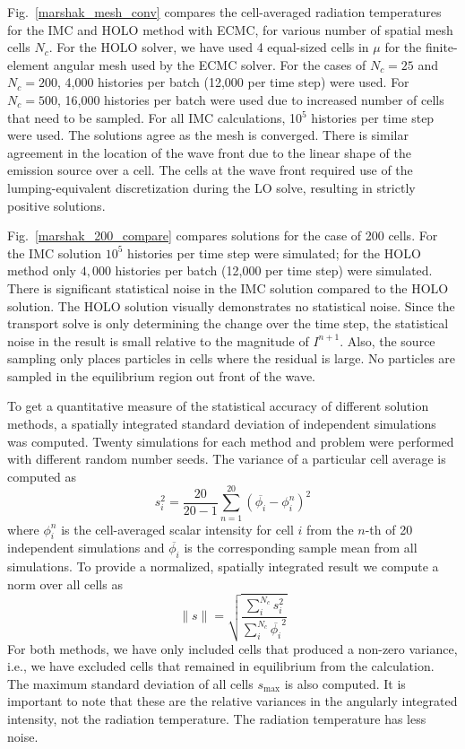\documentclass{mc2013}
\renewcommand{\ss}{\ensuremath{\|s\|}}
\begin{document}
Fig.~\ref{marshak_mesh_conv} compares the cell-averaged radiation temperatures  for the
IMC and HOLO method with ECMC, for various number of spatial mesh cells $N_c$.  For the HOLO solver, we have used
4 equal-sized cells in $\mu$ for the finite-element angular mesh used by the ECMC solver. For the cases
of $N_c=25$ and $N_c=200$, 4,000 histories per batch (12,000 per time step)  were used.  For $N_c=500$, 16,000 histories per batch were used due to increased number of cells that
need to be sampled.  For all IMC calculations, 10$^5$ histories per time step were used. The solutions agree as the mesh is converged.  There is
similar agreement in the location of the wave front due to the linear shape of the emission source over a cell.  The cells
at the wave front required use of the lumping-equivalent discretization during the LO
solve, resulting in strictly positive solutions.

Fig.~\ref{marshak_200_compare} compares solutions
for the case of 200 cells.  For the IMC solution $10^5$ histories per time step were
simulated; for the HOLO method only $4,000$ histories per batch
(12,000 per time step) were simulated. There is significant statistical noise in the IMC solution
compared to the HOLO solution.  The HOLO solution visually demonstrates no statistical noise.  Since the transport solve is only determining the change over the
time step, the statistical noise in the result is small relative to the magnitude of
$I^{n+1}$.  Also, the source sampling only places particles in cells where the residual is
large.  No particles are sampled in the equilibrium region out front of the wave. 

To get a quantitative measure of the statistical accuracy of different solution
methods, a spatially integrated standard deviation of independent simulations was
computed. Twenty simulations for each method and problem were performed with different
random number seeds.  The variance of a particular cell average is
computed as 
\begin{equation} 
    s_i^2 =  \frac{20}{20-1} \sum_{n=1}^{20} \left(\overline{\phi_{i}} - \phi_{i}^n\right)^2
\end{equation}
where $\phi_{i}^n$ is the cell-averaged scalar intensity for cell $i$ from the $n$-th of 20 independent simulations and
$\overline{\phi_{i}}$ is the corresponding sample mean from all simulations. To
provide a normalized, spatially integrated result we compute a norm over all cells as 
\begin{equation}
    \ss = \sqrt{\frac{\sum_{i}^{N_c} s_i^2}{\sum_{i}^{N_c}\overline{\phi_{i}}^2}}
\end{equation}
For both
methods, we have only included cells that produced a non-zero variance, i.e., we have
excluded cells that remained in equilibrium from the calculation.  
 The maximum standard deviation of all cells $s_{\max}$ is also computed.  It is important
to note that these are the relative variances in the angularly integrated intensity,
not the radiation temperature. The radiation temperature has less noise.
\end{document}
